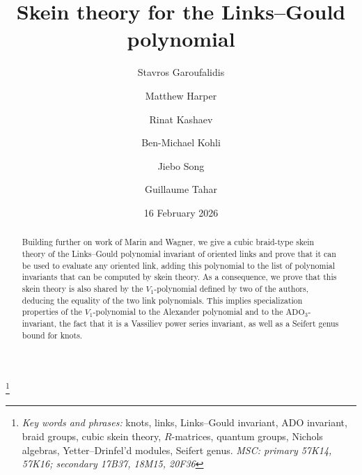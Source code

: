 \documentclass[12pt,reqno]{amsart}
\theoremstyle{definition}
\def\ADO{\mathrm{ADO}}
\begin{document}
\title[Skein theory for the Links--Gould polynomial]{
  Skein theory for the Links--Gould polynomial}
\author[S. Garoufalidis]{Stavros Garoufalidis}
\address{%
  International Center for Mathematics, Department of Mathematics \\
  Southern University of Science and Technology \\
  Shenzhen, China \newline
  {\tt \url{http://people.mpim-bonn.mpg.de/stavros}}}

\author[M. Harper]{Matthew Harper}
\address{Michigan State University, East Lansing, Michigan, USA}

\author[R. Kashaev]{Rinat Kashaev}
\address{Section de Math\'ematiques, Universit\'e de Gen\`eve \\
rue du Conseil-G\'en\'eral 7-9, 1205 Gen\`eve, Switzerland \newline
         {\tt \url{http://www.unige.ch/math/folks/kashaev}}}
       
\author[B.-M. Kohli]{Ben-Michael Kohli}
\address{Section de Math\'ematiques, Universit\'e de Gen\`eve \\
rue du Conseil-G\'en\'eral 7-9, 1205 Gen\`eve, Switzerland}

\author[J. Song]{Jiebo Song}
\address{Beijing Institute of Mathematical Sciences and Applications,
  Huairou District, Beijing, China}

\author[G. Tahar]{Guillaume Tahar}
\address{Beijing Institute of Mathematical Sciences and Applications,
  Huairou District, Beijing, China}

\thanks{
  {\em Key words and phrases:}
  knots, links, Links--Gould invariant, ADO invariant, braid groups,
  cubic skein theory, $R$-matrices, quantum groups, Nichols algebras,
  Yetter--Drinfel'd modules, Seifert genus.\newline
  {\em MSC: primary 57K14, 57K16; secondary 17B37, 18M15, 20F36}
}

\date{16 February 2026}

\begin{abstract}
Building further on work of Marin and Wagner, we give a cubic braid-type skein theory of the Links--Gould polynomial invariant of oriented links and prove that it can be used to evaluate any oriented link, adding this polynomial to the list of polynomial invariants that can be computed by skein theory. As a consequence, we prove that this skein theory is also shared by the $V_1$-polynomial defined by two of the authors, deducing the equality of the two link polynomials. This implies specialization properties of the $V_1$-polynomial to the Alexander polynomial and to the $\ADO_3$-invariant, the fact that it is a Vassiliev power series invariant, as well as a Seifert genus bound for knots.
\end{abstract}
\end{document}
